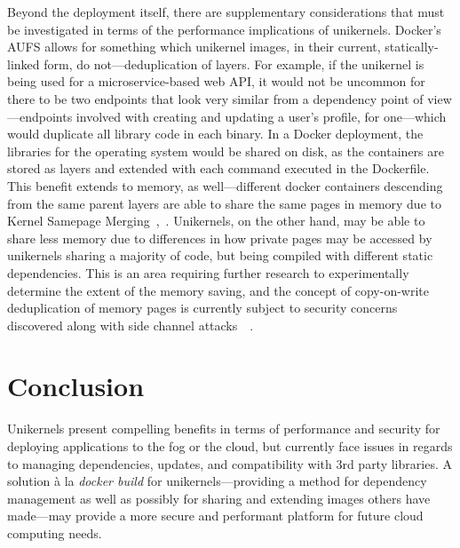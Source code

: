 \documentclass[conference]{IEEEtran}
\begin{document}
Beyond the deployment itself, there are supplementary
considerations that must be investigated in terms of the
performance implications of unikernels. Docker’s AUFS allows for
something which unikernel images, in their current,
statically-linked form, do not—deduplication of layers. For
example, if the unikernel is being used for a microservice-based
web API, it would not be uncommon for there to be two endpoints
that look very similar from a dependency point of view—endpoints
involved with creating and updating a user’s profile, for
one—which would duplicate all library code in each binary. In a
Docker deployment, the libraries for the operating system would
be shared on disk, as the containers are stored as layers and
extended with each command executed in the Dockerfile. This
benefit extends to memory, as well—different docker containers
descending from the same parent layers are able to share the same
pages in memory due to Kernel Samepage
Merging~\cite{dockerdedup},~\cite{ksm}.  Unikernels, on the other
hand, may be able to share less memory due to differences in how
private pages may be accessed by unikernels sharing a majority of
code, but being compiled with different static dependencies. This
is an area requiring further research to experimentally determine
the extent of the memory saving, and the concept of copy-on-write
deduplication of memory pages is currently subject to security
concerns discovered along with side channel
attacks~\cite{ksm}~\cite{sidechannelattacks}.

\section{Conclusion}

Unikernels present compelling benefits in terms of performance
and security for deploying applications to the fog or the cloud,
but currently face issues in regards to managing dependencies,
updates, and compatibility with 3rd party libraries. A solution à
la \textit{docker build} for unikernels—providing a method for
dependency management as well as possibly for sharing and
extending images others have made—may provide a more secure and
performant platform for future cloud computing needs.

\vspace{12pt}




\end{document}
